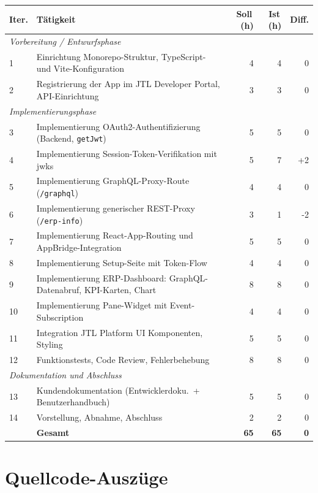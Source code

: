 \documentclass[11pt, a4paper, oneside]{report}
\begin{document}
\begin{tabularx}{\textwidth}{l X r r r}
  \toprule
  \textbf{Iter.} & \textbf{Tätigkeit} & \textbf{Soll\,(h)} & \textbf{Ist\,(h)} & \textbf{Diff.} \\
  \midrule
  \multicolumn{5}{l}{\textit{Vorbereitung / Entwurfsphase}} \\
  \midrule
  1 & Einrichtung Monorepo-Struktur, TypeScript- und Vite-Konfiguration & 4 & 4 & 0 \\
  2 & Registrierung der App im JTL Developer Portal, API-Einrichtung & 3 & 3 & 0 \\
  \midrule
  \multicolumn{5}{l}{\textit{Implementierungsphase}} \\
  \midrule
  3 & Implementierung OAuth2-Authentifizierung (Backend, \texttt{getJwt}) & 5 & 5 & 0 \\
  4 & Implementierung Session-Token-Verifikation mit \gls{jwks} & 5 & 7 & +2 \\
  5 & Implementierung GraphQL-Proxy-Route (\texttt{/graphql}) & 4 & 4 & 0 \\
  6 & Implementierung generischer REST-Proxy (\texttt{/erp-info}) & 3 & 1 & -2 \\
  7 & Implementierung React-App-Routing und AppBridge-Integration & 5 & 5 & 0 \\
  8 & Implementierung Setup-Seite mit Token-Flow & 4 & 4 & 0 \\
  9 & Implementierung ERP-Dashboard: GraphQL-Datenabruf, KPI-Karten, Chart & 8 & 8 & 0 \\
  10 & Implementierung Pane-Widget mit Event-Subscription & 4 & 4 & 0 \\
  11 & Integration JTL Platform UI Komponenten, Styling & 5 & 5 & 0 \\
  12 & Funktionstests, Code Review, Fehlerbehebung & 8 & 8 & 0 \\
  \midrule
  \multicolumn{5}{l}{\textit{Dokumentation und Abschluss}} \\
  \midrule
  13 & Kundendokumentation (Entwicklerdoku.\ + Benutzerhandbuch) & 5 & 5 & 0 \\
  14 & Vorstellung, Abnahme, Abschluss & 2 & 2 & 0 \\
  \midrule
  & \textbf{Gesamt} & \textbf{65} & \textbf{65} & \textbf{0} \\
  \bottomrule
\end{tabularx}

\section{Quellcode-Auszüge}
\label{anhang:quellcode}
\end{document}
